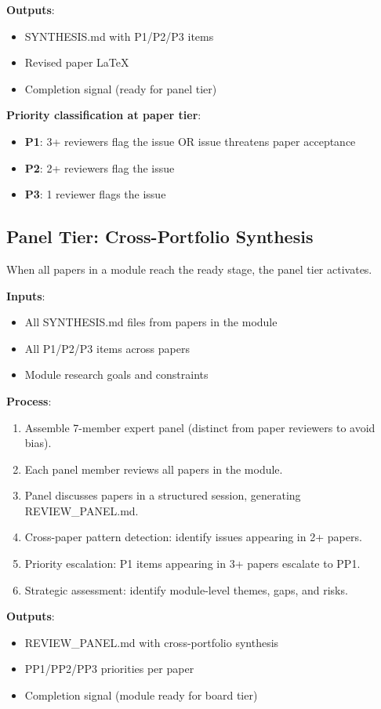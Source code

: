 \textbf{Outputs}:
\begin{itemize}
\item SYNTHESIS.md with P1/P2/P3 items
\item Revised paper LaTeX
\item Completion signal (ready for panel tier)
\end{itemize}

\textbf{Priority classification at paper tier}:
\begin{itemize}
\item \textbf{P1}: 3+ reviewers flag the issue OR issue threatens paper acceptance
\item \textbf{P2}: 2+ reviewers flag the issue
\item \textbf{P3}: 1 reviewer flags the issue
\end{itemize}

\subsection{Panel Tier: Cross-Portfolio Synthesis}

When all papers in a module reach the ready stage, the panel tier activates.

\textbf{Inputs}:
\begin{itemize}
\item All SYNTHESIS.md files from papers in the module
\item All P1/P2/P3 items across papers
\item Module research goals and constraints
\end{itemize}

\textbf{Process}:
\begin{enumerate}
\item Assemble 7-member expert panel (distinct from paper reviewers to avoid bias).
\item Each panel member reviews all papers in the module.
\item Panel discusses papers in a structured session, generating REVIEW\_PANEL.md.
\item Cross-paper pattern detection: identify issues appearing in 2+ papers.
\item Priority escalation: P1 items appearing in 3+ papers escalate to PP1.
\item Strategic assessment: identify module-level themes, gaps, and risks.
\end{enumerate}

\textbf{Outputs}:
\begin{itemize}
\item REVIEW\_PANEL.md with cross-portfolio synthesis
\item PP1/PP2/PP3 priorities per paper
\item Completion signal (module ready for board tier)
\end{itemize}

